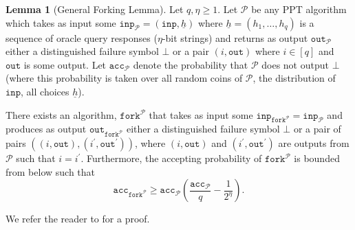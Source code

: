 \documentclass{mrl}
\theoremstyle{definition}
\numberwithin{theorem}{subsection}
\newtheorem{lemma}[theorem]{Lemma}
\newcommand{\adversary}{\mathcal{A}}
\begin{document}
\begin{lemma}[General Forking Lemma]\label{genfork}
Let $q, \eta \geq 1$. Let $\mathcal{P}$ be any PPT algorithm which takes as input some $\texttt{inp}_\mathcal{P} = (\texttt{inp}, \underline{h})$ where $\underline{h} = (h_1, \ldots, h_q)$ is a sequence of oracle query responses ($\eta$-bit strings) and returns as output $\texttt{out}_{\mathcal{P}}$ either a distinguished failure symbol $\bot$ or a pair $(i, \texttt{out})$ where $i \in [q]$ and $\texttt{out}$ is some output. Let $\texttt{acc}_{\mathcal{P}}$ denote the probability that $\mathcal{P}$ does not output $\bot$ (where this probability is taken over all random coins of $\mathcal{P}$, the distribution of $\texttt{inp}$, all choices $\underline{h}$). 

There exists an algorithm, $\texttt{fork}^{\mathcal{P}}$ that takes as input some $\texttt{inp}_{\texttt{fork}^{\mathcal{P}}} = \texttt{inp}_{\mathcal{P}}$ and produces as output $\texttt{out}_{\texttt{fork}^{\mathcal{P}}}$ either a distinguished failure symbol $\bot$ or a pair of pairs $((i, \texttt{out}), (i^\prime, \texttt{out}^\prime))$, where $(i, \texttt{out})$ and $(i^\prime, \texttt{out}^\prime)$ are outputs from $\mathcal{P}$ such that $i = i^\prime$. Furthermore, the accepting probability of $\texttt{fork}^{\mathcal{P}}$ is bounded from below such that \[\texttt{acc}_{\texttt{fork}^{\mathcal{P}}} \geq \texttt{acc}_{\mathcal{P}} \left(\frac{\texttt{acc}_{\mathcal{P}}}{q} - \frac{1}{2^\eta}\right).\]
\end{lemma}

We refer the reader to \cite{bellare2006multi} for a proof.%
\end{document}
